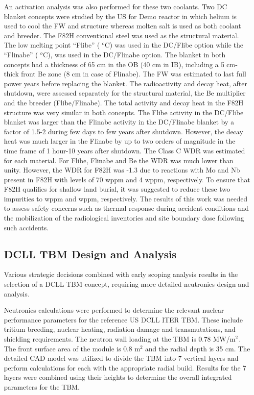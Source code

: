 An activation analysis was also performed for these two coolants.  Two
\gls{DC} blanket concepts were studied by the US for Demo reactor in which
helium is used to cool the \gls{FW} and structure whereas molten salt is used
as both coolant and breeder. The F82H conventional steel was used as the
structural material. The low melting point “Flibe” ( $^o$C) was
used in the DC/Flibe option while the “Flinabe” ( $^o$C), was
used in the DC/Flinabe option. The blanket in both concepts had a thickness of
65 cm in the \gls{OB} (40 cm in \gls{IB}), including a 5 cm-thick front Be
zone (8 cm in case of Flinabe). The \gls{FW} was estimated to last  full power years before replacing the blanket. The radioactivity and decay
heat, after shutdown, were assessed separately for the structural material,
the Be multiplier and the breeder (Flibe/Flinabe). The total activity and
decay heat in the F82H structure was very similar in both concepts. The Flibe
activity in the DC/Flibe blanket was larger than the Flinabe activity in the
DC/Flinabe blanket by a factor of 1.5-2 during few days to few years after
shutdown.  However, the decay heat was much larger in the Flinabe by up to two
orders of magnitude in the time frame of 1 hour-10 years after shutdown. The
Class C \gls{WDR} was estimated for each material. For Flibe, Flinabe and Be
the \gls{WDR} was much lower than unity.  However, the \gls{WDR} for F82H was
-1.3 due to reactions with Mo and Nb present in F82H with
levels of 70 wppm and 4 wppm, respectively. To ensure that F82H qualifies for
shallow land burial, it was suggested to reduce these two impurities to
 wppm and  wppm, respectively. The results of this
work was needed to assess safety concerns such as thermal response during
accident conditions and the mobilization of the radiological inventories and
site boundary dose following such
accidents.

\subsection{\acrfull{DCLL} \acrfull{TBM} Design and Analysis}

Various strategic decisions combined with early scoping analysis results in
the selection of a \gls{DCLL} \gls{TBM} concept, requiring more detailed
neutronics design and analysis.


Neutronics calculations were performed to determine the relevant nuclear
performance parameters for the reference US \gls{DCLL} ITER \gls{TBM}. These
include tritium breeding, nuclear heating, radiation damage and
transmutations, and shielding requirements. The neutron wall loading at the
\gls{TBM} is 0.78 MW/m$^2$. The front surface area of the module is 0.8 m$^2$
and the radial depth is 35 cm. The detailed \gls{CAD} model was utilized to
divide the \gls{TBM} into 7 vertical layers and perform calculations for each
with the appropriate radial build. Results for the 7 layers were combined
using their heights to determine the overall integrated parameters for the
\gls{TBM}.

